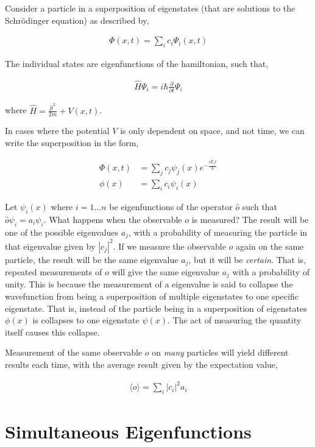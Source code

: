 \documentclass[11pt]{amsart}
\begin{document}
Consider a particle in a superposition of eigenstates (that are solutions to the Schr\"{o}dinger equation) as described by,

\begin{align*}
  \Phi(x, t) = \sum\limits_i c_i \Psi_i(x, t)
\end{align*}

The individual states are eigenfunctions of the hamiltonian, such that,

\begin{align*}
  \hat{H} \Psi_i = i\hbar\frac{\partial}{\partial t} \Psi_i
\end{align*}

where $\hat{H} = \frac{\hat{p}^2}{2m} + V(x, t)$.

In cases where the potential $V$ is only dependent on space, and not time, we can write the superposition in the form,

\begin{align*}
  \Phi(x, t) &= \sum\limits_j c_j \psi_j(x) e^{-\frac{iE_j t}{\hbar}} \\
  \phi(x) &= \sum\limits_i c_i \psi_i(x)
\end{align*}

Let $\psi_i(x)$ where $i = 1 \dots n$ be eigenfunctions of the operator $\hat{o}$ such that $\hat{o}\psi_i = a_i \psi_i$. What happens when the observable $o$ is measured? The result will be one of the possible eigenvalues $a_j$, with a probability of measuring the particle in that eigenvalue given by ${|c_j|}^2$. If we measure the observable $o$ again on the same particle, the result will be the same eigenvalue $a_j$, but it will be \textit{certain}. That is, repeated measurements of $o$ will give the same eigenvalue $a_j$ with a probability of unity. This is because the measurement of a eigenvalue is said to collapse the wavefunction from being a superposition of multiple eigenstates to one specific eigenstate. That is, instead of the particle being in a superposition of eigenstates $\phi(x)$ is collapses to one eigenstate $\psi(x)$. The act of measuring the quantity itself causes this collapse.

Measurement of the same observable $o$ on \textit{many} particles will yield different results each time, with the average result given by the expectation value,

\begin{align*}
  \langle o \rangle = \sum\limits_i {|c_i|}^2 a_i
\end{align*}


\section{Simultaneous Eigenfunctions}
\end{document}
